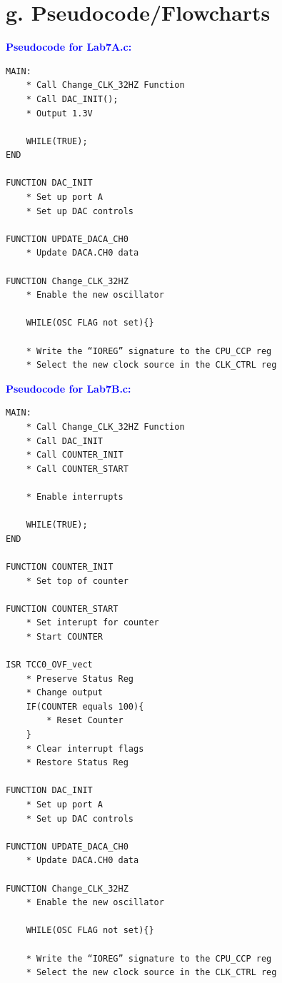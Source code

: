 \documentclass[11pt]{article}
\theoremstyle{plain}
\theoremstyle{definition}
\begin{document}
\section*{g. Pseudocode/Flowcharts}
%
%
\textbf{\textcolor{blue}{Pseudocode for Lab7A.c:}}
\begin{tcolorbox}
\begin{verbatim}
MAIN:
    * Call Change_CLK_32HZ Function
    * Call DAC_INIT();
    * Output 1.3V
    
    WHILE(TRUE);
END  

FUNCTION DAC_INIT 
    * Set up port A
    * Set up DAC controls
    
FUNCTION UPDATE_DACA_CH0
    * Update DACA.CH0 data
        
FUNCTION Change_CLK_32HZ
    * Enable the new oscillator

    WHILE(OSC FLAG not set){}

    * Write the “IOREG” signature to the CPU_CCP reg
    * Select the new clock source in the CLK_CTRL reg  
\end{verbatim}
\end{tcolorbox}
%
%
\newpage
\textbf{\textcolor{blue}{Pseudocode for Lab7B.c:}}
\begin{tcolorbox}
\begin{verbatim}
MAIN:
    * Call Change_CLK_32HZ Function
    * Call DAC_INIT
    * Call COUNTER_INIT
    * Call COUNTER_START
    
    * Enable interrupts
    
    WHILE(TRUE);
END  

FUNCTION COUNTER_INIT
    * Set top of counter

FUNCTION COUNTER_START
    * Set interupt for counter
    * Start COUNTER
    
ISR TCC0_OVF_vect
    * Preserve Status Reg     
    * Change output 
    IF(COUNTER equals 100){
        * Reset Counter
    }
    * Clear interrupt flags
    * Restore Status Reg
    
FUNCTION DAC_INIT 
    * Set up port A
    * Set up DAC controls
	
FUNCTION UPDATE_DACA_CH0
    * Update DACA.CH0 data
	
FUNCTION Change_CLK_32HZ
    * Enable the new oscillator
	
    WHILE(OSC FLAG not set){}
	
    * Write the “IOREG” signature to the CPU_CCP reg
    * Select the new clock source in the CLK_CTRL reg  
\end{verbatim}
\end{tcolorbox}
\end{document}
